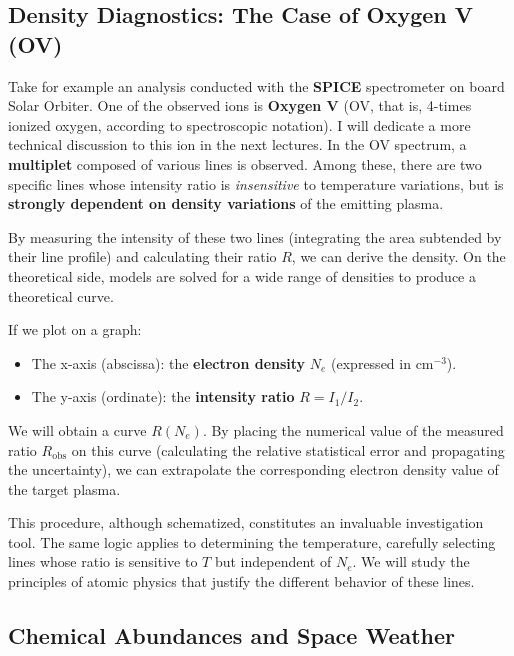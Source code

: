     \subsection{Density Diagnostics: The Case of Oxygen V (OV)}
    
    Take for example an analysis conducted with the \textbf{SPICE} spectrometer on board Solar Orbiter. One of the observed ions is \textbf{Oxygen V} (OV, that is, 4-times ionized oxygen, according to spectroscopic notation). I will dedicate a more technical discussion to this ion in the next lectures.
    In the OV spectrum, a \textbf{multiplet} composed of various lines is observed. Among these, there are two specific lines whose intensity ratio is \textit{insensitive} to temperature variations, but is \textbf{strongly dependent on density variations} of the emitting plasma.
    
    By measuring the intensity of these two lines (integrating the area subtended by their line profile) and calculating their ratio $R$, we can derive the density.
    On the theoretical side, models are solved for a wide range of densities to produce a theoretical curve.
    
    If we plot on a graph:
    \begin{itemize}
        \item The x-axis (abscissa): the \textbf{electron density} $N_e$ (expressed in $\text{cm}^{-3}$).
        \item The y-axis (ordinate): the \textbf{intensity ratio} $R = I_1 / I_2$.
    \end{itemize}
    We will obtain a curve $R(N_e)$. By placing the numerical value of the measured ratio $R_{\text{obs}}$ on this curve (calculating the relative statistical error and propagating the uncertainty), we can extrapolate the corresponding electron density value of the target plasma.
    
    This procedure, although schematized, constitutes an invaluable investigation tool. The same logic applies to determining the temperature, carefully selecting lines whose ratio is sensitive to $T$ but independent of $N_e$. We will study the principles of atomic physics that justify the different behavior of these lines.
    
    \subsection{Chemical Abundances and Space Weather}
    
